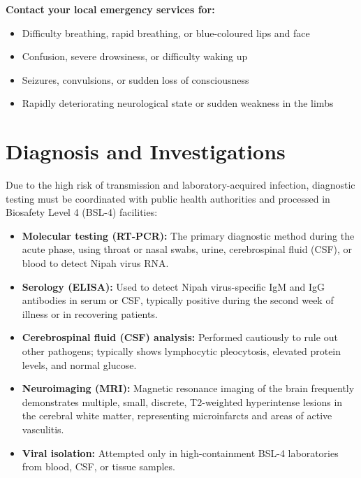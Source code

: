 \textbf{Contact your local emergency services for:}
\begin{itemize}
    \item Difficulty breathing, rapid breathing, or blue-coloured lips and face
    \item Confusion, severe drowsiness, or difficulty waking up
    \item Seizures, convulsions, or sudden loss of consciousness
    \item Rapidly deteriorating neurological state or sudden weakness in the limbs
\end{itemize}

\section*{Diagnosis and Investigations}
Due to the high risk of transmission and laboratory-acquired infection, diagnostic testing must be coordinated with public health authorities and processed in Biosafety Level 4 (BSL-4) facilities:
\begin{itemize}
    \item \textbf{Molecular testing (RT-PCR):} The primary diagnostic method during the acute phase, using throat or nasal swabs, urine, cerebrospinal fluid (CSF), or blood to detect Nipah virus RNA.
    \item \textbf{Serology (ELISA):} Used to detect Nipah virus-specific IgM and IgG antibodies in serum or CSF, typically positive during the second week of illness or in recovering patients.
    \item \textbf{Cerebrospinal fluid (CSF) analysis:} Performed cautiously to rule out other pathogens; typically shows lymphocytic pleocytosis, elevated protein levels, and normal glucose.
    \item \textbf{Neuroimaging (MRI):} Magnetic resonance imaging of the brain frequently demonstrates multiple, small, discrete, T2-weighted hyperintense lesions in the cerebral white matter, representing microinfarcts and areas of active vasculitis.
    \item \textbf{Viral isolation:} Attempted only in high-containment BSL-4 laboratories from blood, CSF, or tissue samples.
\end{itemize}

